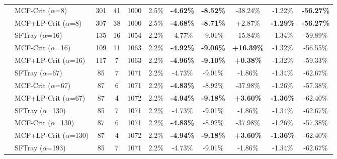 \begin{table}[t]
{\begin{tabular}{ll|cccc|ccc|cc}
 & MCF-Crit ($\alpha$=8) & 301 & 41 & 1000 & 2.5\% & \textbf{-4.62\%} & \textbf{-8.52\%} & -38.24\% & -1.22\% & \textbf{-56.27\%} \\

 & MCF+LP-Crit ($\alpha$=8) & 307 & 38 & 1000 & 2.5\% & \textbf{-4.68\%} & \textbf{-8.71\%} & +2.87\% & \textbf{-1.29\%} & \textbf{-56.27\%} \\

\addlinespace[0.5em]

 & SFTray ($\alpha$=16) & 135 & 16 & 1054 & 2.2\% & -4.77\% & -9.01\% & -15.84\% & -1.34\% & -59.89\% \\

 & MCF-Crit ($\alpha$=16) & 109 & 11 & 1063 & 2.2\% & \textbf{-4.92\%} & \textbf{-9.06\%} & \textbf{+16.39\%} & -1.32\% & -56.55\% \\

 & MCF+LP-Crit ($\alpha$=16) & 117 & 7 & 1063 & 2.2\% & \textbf{-4.96\%} & \textbf{-9.10\%} & \textbf{+0.38\%} & -1.32\% & -59.33\% \\

\addlinespace[0.5em]

 & SFTray ($\alpha$=67) & 85 & 7 & 1071 & 2.2\% & -4.73\% & -9.01\% & -1.86\% & -1.34\% & -62.67\% \\

 & MCF-Crit ($\alpha$=67) & 87 & 6 & 1071 & 2.2\% & \textbf{-4.83\%} & -8.92\% & -37.98\% & -1.26\% & -57.38\% \\

 & MCF+LP-Crit ($\alpha$=67) & 87 & 4 & 1072 & 2.2\% & \textbf{-4.94\%} & \textbf{-9.18\%} & \textbf{+3.60\%} & \textbf{-1.36\%} & -62.40\% \\

\addlinespace[0.5em]

 & SFTray ($\alpha$=130) & 85 & 7 & 1071 & 2.2\% & -4.73\% & -9.01\% & -1.86\% & -1.34\% & -62.67\% \\

 & MCF-Crit ($\alpha$=130) & 87 & 6 & 1071 & 2.2\% & \textbf{-4.83\%} & -8.92\% & -37.98\% & -1.26\% & -57.38\% \\

 & MCF+LP-Crit ($\alpha$=130) & 87 & 4 & 1072 & 2.2\% & \textbf{-4.94\%} & \textbf{-9.18\%} & \textbf{+3.60\%} & \textbf{-1.36\%} & -62.40\% \\

\addlinespace[0.5em]

 & SFTray ($\alpha$=193) & 85 & 7 & 1071 & 2.2\% & -4.73\% & -9.01\% & -1.86\% & -1.34\% & -62.67\% \\


\end{tabular}}
\end{table}
